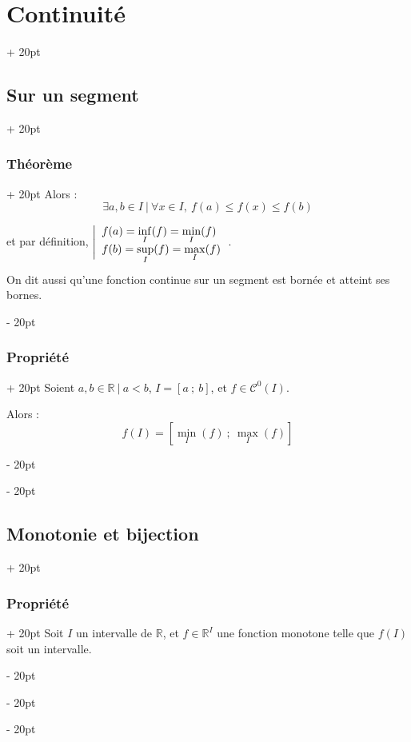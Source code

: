 \documentclass[a4paper, 12pt, twoside]{article}
\newcommand{\R}{\mathbb{R}} %
\newcommand{\seg}[2]{\left[ #1\ ;\ #2 \right]}
\renewcommand{\le}{\leqslant}
\newcommand{\ind}[1][20pt]{\advance\leftskip + #1}
\newcommand{\deind}[1][20pt]{\advance\leftskip - #1}
\newenvironment{indt}[2][20pt]{#2 \par \ind[#1]}{\par \deind} %
\begin{document}
\begin{indt}{\section{Continuité}}
\begin{indt}{\subsection{Sur un segment}}
\begin{indt}{\subsubsection{Théorème}}
                Alors :
                \[
                    \exists a, b \in I\ |\
                    \forall x \in I,\
                    f(a) \le f(x) \le f(b)
                \]

                \vspace{6pt}
                
                et par définition,
                $
                    \left|
                    \begin{array}{l}
                        f(a) = \displaystyle \inf_I(f) = \min_I(f)
                        \\
                        f(b) = \displaystyle \sup_I(f) = \max_I(f)
                        \vspace{-3pt}
                    \end{array}
                    \right.
                $.

                \vspace{6pt}
                
                On dit aussi qu'une fonction continue sur un segment est bornée et atteint ses bornes.
            \end{indt}

            \vspace{12pt}
            
            \begin{indt}{\subsubsection{Propriété}}
                Soient $a, b \in \R\ |\ a < b$, $I = \seg a b$, et $f \in \mathcal C^0(I)$.

                Alors :
                \[
                    f(I) = \seg{\min_I(f)}{\max_I(f)}
                \]
            \end{indt}
        \end{indt}

        \vspace{12pt}
        
        \begin{indt}{\subsection{Monotonie et bijection}}
            \begin{indt}{\subsubsection{Propriété}}
                Soit $I$ un intervalle de $\R$, et $f \in \R^I$ une fonction monotone telle que $f(I)$ soit un intervalle.


\end{indt}
\end{indt}
\end{indt}
\end{document}
